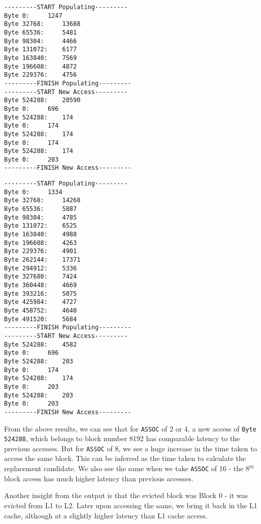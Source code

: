\documentclass[12pt,a4paper,english]{paper}
\newenvironment{colorboxed}[4][gray]{
\begin{tcolorbox}[colback=#1!3!white,colframe=#1(ryb)!50!black,title=\textbf{#2 #3},#4]
}{
\end{tcolorbox}
}
\begin{document}
\begin{colorboxed}{Output: }{\texttt{\textbf{ASSOC = 8}}}{breakable}
\begin{verbatim}
---------START Populating---------
Byte 0: 	1247
Byte 32768: 	13688
Byte 65536: 	5481
Byte 98304: 	4466
Byte 131072: 	6177
Byte 163840: 	7569
Byte 196608: 	4872
Byte 229376: 	4756
---------FINISH Populating---------
---------START New Access---------
Byte 524288: 	20590
Byte 0: 	696
Byte 524288: 	174
Byte 0: 	174
Byte 524288: 	174
Byte 0: 	174
Byte 524288: 	174
Byte 0: 	203
---------FINISH New Access---------
\end{verbatim}
\end{colorboxed}

\begin{colorboxed}{Output: }{\texttt{\textbf{ASSOC = 16}}}{breakable}
\begin{verbatim}
---------START Populating---------
Byte 0: 	1334
Byte 32768: 	14268
Byte 65536: 	5887
Byte 98304: 	4785
Byte 131072: 	6525
Byte 163840: 	4988
Byte 196608: 	4263
Byte 229376: 	4901
Byte 262144: 	17371
Byte 294912: 	5336
Byte 327680: 	7424
Byte 360448: 	4669
Byte 393216: 	5075
Byte 425984: 	4727
Byte 458752: 	4640
Byte 491520: 	5684
---------FINISH Populating---------
---------START New Access---------
Byte 524288: 	4582
Byte 0: 	696
Byte 524288: 	203
Byte 0: 	174
Byte 524288: 	174
Byte 0: 	203
Byte 524288: 	203
Byte 0: 	203
---------FINISH New Access---------
\end{verbatim}
\end{colorboxed}

From the above results, we can see that for \texttt{ASSOC} of 2 or 4, a new access of \texttt{Byte 524288}, which belongs to block number 8192 has comparable latency to the previous accesses. But for \texttt{ASSOC} of 8, we see a huge increase in the time taken to access the same block. This can be inferred as the time taken to calculate the replacement candidate. We also see the same when we take \texttt{ASSOC} of 16 - the 8$^{th}$ block access has much higher latency than previous accesses.

Another insight from the output is that the evicted block was Block 0 - it was evicted from L1 to L2. Later upon accessing the same, we bring it back in the L1 cache, although at a slightly higher latency than L1 cache access.


\newpage %



\end{document}
